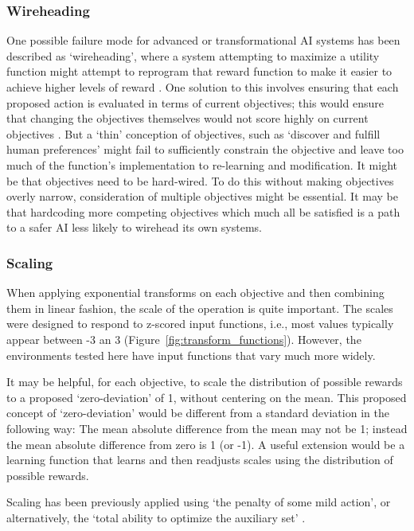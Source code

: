 \subsubsection{Wireheading}

One possible failure mode for advanced or transformational AI systems has been described as `wireheading', where a system attempting to maximize a utility function might attempt to reprogram that reward function to make it easier to achieve higher levels of reward \cite{demski_a_stable_2017}. One solution to this involves ensuring that each proposed action is evaluated in terms of current objectives; this would ensure that changing the objectives themselves would not score highly on current objectives \cite{dewey_learning_2011}. But a `thin' conception of objectives, such as `discover and fulfill human preferences' might fail to sufficiently constrain the objective and leave too much of the function's implementation to re-learning and modification. It might be that objectives need to be hard-wired. To do this without making objectives overly narrow, consideration of multiple objectives might be essential. It may be that hardcoding more competing objectives which much all be satisfied is a path to a safer AI less likely to wirehead its own systems.

\subsubsection{Scaling}

When applying exponential transforms  on each objective and then combining them in linear fashion, the scale of the operation is quite important. The scales were designed to respond to z-scored input functions, i.e., most values typically appear between -3 an 3 (Figure~\ref{fig:transform_functions}). However, the environments tested here have input functions that vary much more widely.

It may be helpful, for each objective, to scale the distribution of possible rewards to a proposed `zero-deviation' of 1, without centering on the mean. This proposed concept of `zero-deviation' would be different from a standard deviation in the following way: The mean absolute difference from the mean may not be 1; instead the mean absolute difference from zero is 1 (or -1). A useful extension would be a learning function that learns and then readjusts scales using the distribution of possible rewards.

Scaling has been previously applied using `the penalty of some mild action', or alternatively, the `total ability to optimize the auxiliary set' %
\cite{turner_conservative_2020}.


